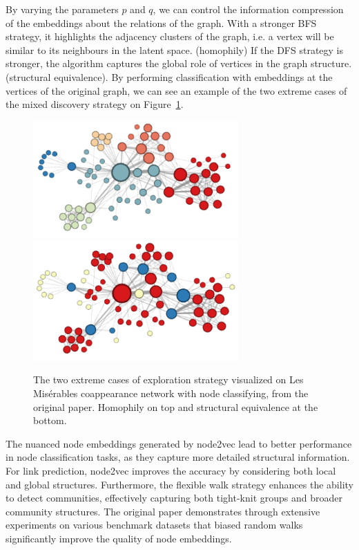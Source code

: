 By varying the parameters $p$ and $q$, we can control the information compression of the embeddings about the relations of the graph. With a stronger BFS strategy, it highlights the adjacency clusters of the graph, i.e. a vertex will be similar to its neighbours in the latent space. (homophily) If the DFS strategy is stronger, the algorithm captures the global role of vertices in the graph structure. (structural equivalence). By performing classification with embeddings at the vertices of the original graph, we can see an example of the two extreme cases of the mixed discovery strategy on Figure~\ref{strategies_visual}.

\begin{figure}[ht!]
	\centering
	\includegraphics[width=0.70\textwidth]{figures/homo}
	\includegraphics[width=0.70\textwidth]{figures/struceq}
	\caption{The two extreme cases of exploration strategy visualized on Les Mis\'{e}rables coappearance network with node classifying, from the original paper.\cite{DBLP:journals/corr/GroverL16} Homophily on top and structural equivalence at the bottom.}
        \label{strategies_visual}
\end{figure}

The nuanced node embeddings generated by node2vec lead to better performance in node classification tasks, as they capture more detailed structural information. For link prediction, node2vec improves the accuracy by considering both local and global structures. Furthermore, the flexible walk strategy enhances the ability to detect communities, effectively capturing both tight-knit groups and broader community structures. The original paper \cite{DBLP:journals/corr/GroverL16} demonstrates through extensive experiments on various benchmark datasets that biased random walks significantly improve the quality of node embeddings. 


